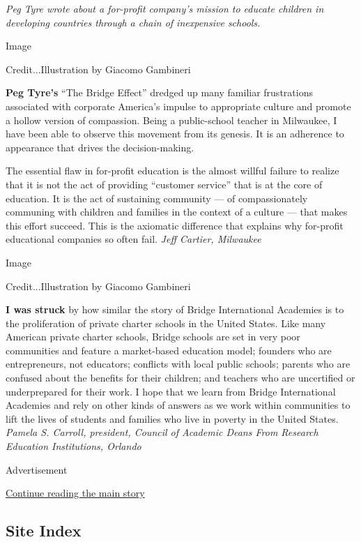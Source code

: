 \emph{Peg Tyre wrote about a for-profit company's mission to educate
children in developing countries through a chain of inexpensive
schools.}

Image

Credit...Illustration by Giacomo Gambineri

\textbf{Peg Tyre's} ``The Bridge Effect'' dredged up many familiar
frustrations associated with corporate America's impulse to appropriate
culture and promote a hollow version of compassion. Being a
public-school teacher in Milwaukee, I have been able to observe this
movement from its genesis. It is an adherence to appearance that drives
the decision-making.

The essential flaw in for-profit education is the almost willful failure
to realize that it is not the act of providing ``customer service'' that
is at the core of education. It is the act of sustaining community ---
of compassionately communing with children and families in the context
of a culture --- that makes this effort succeed. This is the axiomatic
difference that explains why for-profit educational companies so often
fail. \emph{Jeff Cartier, Milwaukee}

Image

Credit...Illustration by Giacomo Gambineri

\textbf{I was struck} by how similar the story of Bridge International
Academies is to the proliferation of private charter schools in the
United States. Like many American private charter schools, Bridge
schools are set in very poor communities and feature a market-based
education model; founders who are entrepreneurs, not educators;
conflicts with local public schools; parents who are confused about the
benefits for their children; and teachers who are uncertified or
underprepared for their work. I hope that we learn from Bridge
International Academies and rely on other kinds of answers as we work
within communities to lift the lives of students and families who live
in poverty in the United States. \emph{Pamela S. Carroll, president,
Council of Academic Deans From Research Education Institutions, Orlando}

Advertisement

\protect\hyperlink{after-bottom}{Continue reading the main story}

\hypertarget{site-index}{%
\subsection{Site Index}\label{site-index}}

